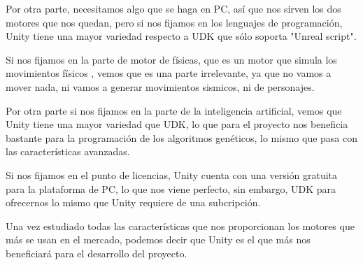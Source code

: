 Por otra parte, necesitamos algo que se haga en PC, así que nos sirven los dos motores que nos quedan, pero si nos fijamos en los lenguajes de programación, Unity tiene una mayor variedad respecto a UDK que sólo soporta "Unreal script".

Si nos fijamos en la parte de motor de físicas, que es un motor que simula los movimientos físicos \cite{B10}, vemos que es una parte irrelevante, ya que no vamos a mover nada, ni vamos a generar movimientos sismicos, ni de personajes.

Por otra parte si nos fijamos en la parte de la inteligencia artificial, vemos que Unity tiene una mayor variedad que UDK, lo que para el proyecto nos beneficia bastante para la programación de los algoritmos genéticos, lo mismo que pasa con las características avanzadas.

Si nos fijamos en el punto de licencias, Unity cuenta con una versión gratuita para la plataforma de PC, lo que nos viene perfecto, sin embargo, UDK para ofrecernos lo mismo que Unity requiere de una subcripción.

Una vez estudiado todas las características que nos proporcionan los motores que más se usan en el mercado, podemos decir que Unity es el que más nos beneficiará para el desarrollo del proyecto.


\newpage




